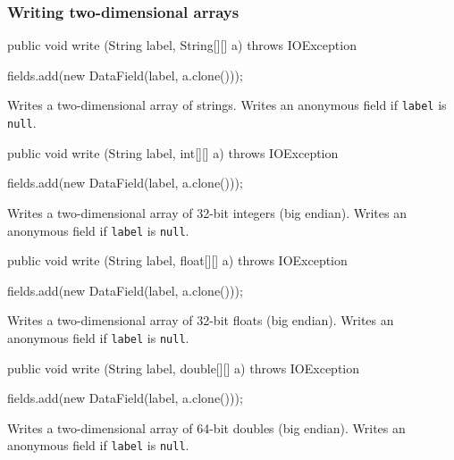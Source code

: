 \subsubsection*{Writing two-dimensional arrays}

\begin{code}

   public void write (String label, String[][] a) throws IOException \begin{hide} {
      fields.add(new DataField(label, a.clone()));
   }
   \end{hide}
\end{code}
\begin{tabb}
Writes a two-dimensional array of strings.
Writes an anonymous field if \texttt{label} is \texttt{null}.
\end{tabb}
\begin{code}

   public void write (String label, int[][] a) throws IOException \begin{hide} {
      fields.add(new DataField(label, a.clone()));
   }
   \end{hide}
\end{code}
\begin{tabb}
Writes a two-dimensional array of 32-bit integers (big endian).
Writes an anonymous field if \texttt{label} is \texttt{null}.
\end{tabb}
\begin{code}

   public void write (String label, float[][] a) throws IOException \begin{hide} {
      fields.add(new DataField(label, a.clone()));
   }
   \end{hide}
\end{code}
\begin{tabb}
Writes a two-dimensional array of 32-bit floats (big endian).
Writes an anonymous field if \texttt{label} is \texttt{null}.
\end{tabb}
\begin{code}

   public void write (String label, double[][] a) throws IOException \begin{hide} {
      fields.add(new DataField(label, a.clone()));
   }
   \end{hide}
\end{code}
\begin{tabb}
Writes a two-dimensional array of 64-bit doubles (big endian).
Writes an anonymous field if \texttt{label} is \texttt{null}.
\end{tabb}

\begin{code}\begin{hide}
}
\end{hide}\end{code}
